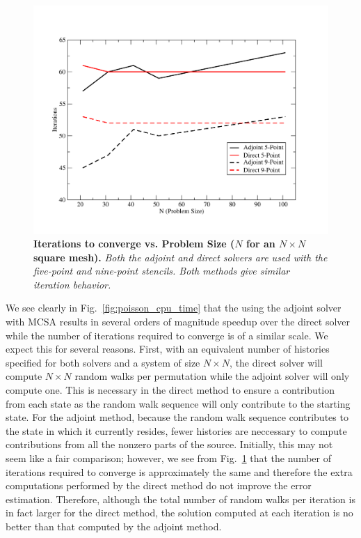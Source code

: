 \begin{figure}[h!]
  \centering
  \includegraphics[width=5in,clip]{chapters/research_proposal/Adjoint_Direct_Iterations.pdf}
  \caption{\textbf{Iterations to converge vs. Problem Size ($N$ for an
      $N \times N$ square mesh).} \textit{Both the adjoint and direct
      solvers are used with the five-point and nine-point
      stencils. Both methods give similar iteration behavior.}}
  \label{fig:poisson_iterations}
\end{figure}

We see clearly in Fig.~\ref{fig:poisson_cpu_time} that the using the
adjoint solver with MCSA results in several orders of magnitude
speedup over the direct solver while the number of iterations required
to converge is of a similar scale. We expect this for several
reasons. First, with an equivalent number of histories specified for
both solvers and a system of size $N \times N$, the direct solver will
compute $N \times N$ random walks per permutation while the adjoint
solver will only compute one. This is necessary in the direct method
to ensure a contribution from each state as the random walk sequence
will only contribute to the starting state. For the adjoint method,
because the random walk sequence contributes to the state in which it
currently resides, fewer histories are neccessary to compute
contributions from all the nonzero parts of the source. Initially,
this may not seem like a fair comparison; however, we see from
Fig.~\ref{fig:poisson_iterations} that the number of iterations
required to converge is approximately the same and therefore the extra
computations performed by the direct method do not improve the error
estimation. Therefore, although the total number of random walks per
iteration is in fact larger for the direct method, the solution
computed at each iteration is no better than that computed by the
adjoint method.


